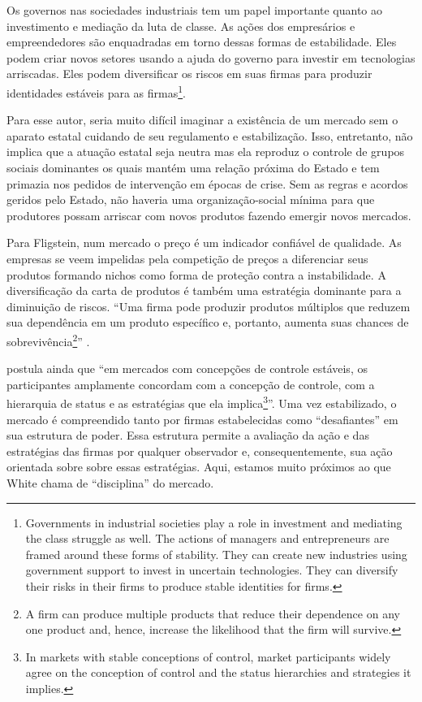 \documentclass[a4paper, 12pt, openright, oneside, german, french, english, brazil]{abntex2}
\begin{document}
	\begin{citacao}
		Os governos nas sociedades industriais tem um papel importante quanto ao investimento e mediação da luta de classe. As ações dos empresários e empreendedores são enquadradas em torno dessas formas de estabilidade. Eles podem criar novos setores usando a ajuda do governo para investir em tecnologias arriscadas. Eles podem diversificar os riscos em suas firmas para produzir identidades estáveis para as firmas\footnote{Governments in industrial societies play a role in investment and mediating the class struggle as well. The actions of managers and entrepreneurs are framed around these forms of stability. They can create new industries using government support to invest in uncertain technologies. They can diversify their risks in their firms to produce stable identities for firms.}. \cite[p. 62]{fligstein2002architecture}
	\end{citacao}
	
	Para esse autor, seria muito difícil imaginar a existência de um mercado sem o aparato estatal cuidando de seu regulamento e estabilização. Isso, entretanto, não implica que a atuação estatal seja neutra mas ela reproduz o controle de grupos sociais dominantes os quais mantém uma relação próxima do Estado e tem primazia nos pedidos de intervenção em épocas de crise. Sem as regras e acordos geridos pelo Estado, não haveria uma organização-social mínima para que produtores possam arriscar com novos produtos fazendo emergir novos mercados.
	
	Para Fligstein, num mercado o preço é um indicador confiável de qualidade. As empresas se veem impelidas pela competição de preços a diferenciar seus produtos formando nichos como forma de proteção contra a instabilidade. A diversificação da carta de produtos é também uma estratégia dominante para a diminuição de riscos. ``Uma firma pode produzir produtos múltiplos que reduzem sua dependência em um produto específico e, portanto, aumenta suas chances de sobrevivência\footnote{A firm can produce multiple products that reduce their dependence on any one product and, hence, increase the likelihood that the firm will survive.}'' . 
	
	 postula ainda que ``em mercados com concepções de controle estáveis, os participantes amplamente concordam com a concepção de controle, com a hierarquia de status e as estratégias que ela implica\footnote{In markets with stable conceptions of control, market participants widely agree on the conception of control and the status hierarchies and strategies it implies.}''. Uma vez estabilizado, o mercado é compreendido tanto por firmas estabelecidas como ``desafiantes'' em sua estrutura de poder. Essa estrutura permite a avaliação da ação e das estratégias das firmas por qualquer observador e, consequentemente, sua ação orientada sobre sobre essas estratégias. Aqui, estamos muito próximos ao que White chama de ``disciplina'' do mercado.
	
\end{document}
